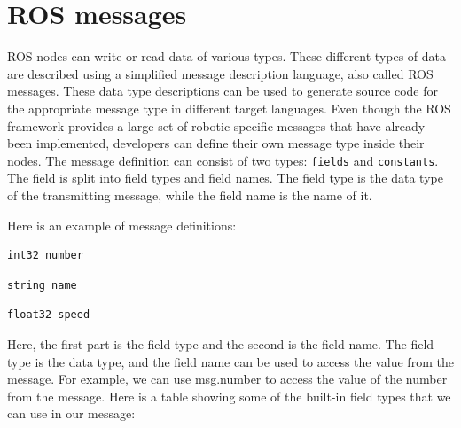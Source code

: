 \documentclass[../../main]{subfiles}
\begin{document}
\section{ROS messages}
ROS nodes can write or read data of various types. These different types of data are
described using a simplified message description language, also called ROS messages.
These data type descriptions can be used to generate source code for the appropriate
message type in different target languages.
Even though the ROS framework provides a large set of robotic-specific messages that
have already been implemented, developers can define their own message type inside their
nodes.
The message definition can consist of two types: \texttt{fields} and \texttt{constants}. The field is
split into field types and field names. The field type is the data type of the transmitting
message, while the field name is the name of it.

Here is an example of message definitions:
\begin{lstlisting}[language=bash, frame=shadowbox]
    int32 number
\end{lstlisting}
\begin{lstlisting}[language=bash, frame=shadowbox]
    string name
\end{lstlisting}
\begin{lstlisting}[language=bash, frame=shadowbox]
    float32 speed
\end{lstlisting}
Here, the first part is the field type and the second is the field name. The field type is
the data type, and the field name can be used to access the value from the message. For
example, we can use msg.number to access the value of the number from the message.
\newpage
Here is a table showing some of the built-in field types that we can use in our message:
\end{document}
